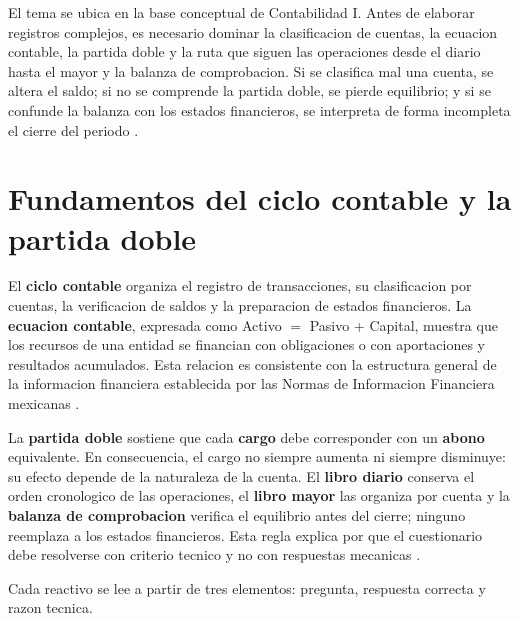\documentclass[
	spanish,
	letterpaper, oneside
]{article}
\begin{document}
El tema se ubica en la base conceptual de Contabilidad I. Antes de elaborar registros complejos, es necesario dominar la clasificacion de cuentas, la ecuacion contable, la partida doble y la ruta que siguen las operaciones desde el diario hasta el mayor y la balanza de comprobacion. Si se clasifica mal una cuenta, se altera el saldo; si no se comprende la partida doble, se pierde equilibrio; y si se confunde la balanza con los estados financieros, se interpreta de forma incompleta el cierre del periodo \citep{cinifNif2025,openstaxFinancialAccounting2019}.

\section{Fundamentos del ciclo contable y la partida doble}

El \textbf{ciclo contable} organiza el registro de transacciones, su clasificacion por cuentas, la verificacion de saldos y la preparacion de estados financieros. La \textbf{ecuacion contable}, expresada como Activo $=$ Pasivo + Capital, muestra que los recursos de una entidad se financian con obligaciones o con aportaciones y resultados acumulados. Esta relacion es consistente con la estructura general de la informacion financiera establecida por las Normas de Informacion Financiera mexicanas \citep{cinifNif2025,imcpNif2024}.

La \textbf{partida doble} sostiene que cada \textbf{cargo} debe corresponder con un \textbf{abono} equivalente. En consecuencia, el cargo no siempre aumenta ni siempre disminuye: su efecto depende de la naturaleza de la cuenta. El \textbf{libro diario} conserva el orden cronologico de las operaciones, el \textbf{libro mayor} las organiza por cuenta y la \textbf{balanza de comprobacion} verifica el equilibrio antes del cierre; ninguno reemplaza a los estados financieros. Esta regla explica por que el cuestionario debe resolverse con criterio tecnico y no con respuestas mecanicas \citep{romeroContabilidad2018,kiesoIntermediateAccounting2020}.


Cada reactivo se lee a partir de tres elementos: pregunta, respuesta correcta y razon tecnica.
\end{document}
